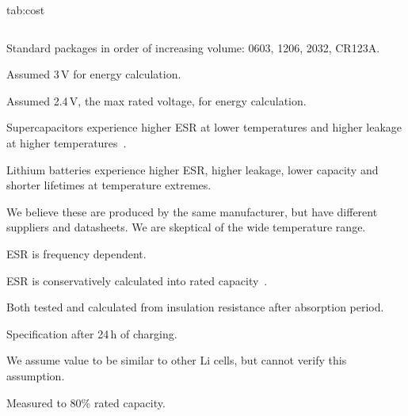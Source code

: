 \begin{definetable*}{tab:cost}
\begin{adjustbox}{width=0.95\textwidth}
\begin{threeparttable}
\begin{tabular}{l | l | S[table-format=3.2,table-align-text-post = false] | S[table-format=3.3,table-align-text-post = false] | c | c | c | c | c | c | c}
   \end{tabular}
    \begin{tablenotes}[para]
        \item[a] Standard packages in order of increasing volume: 0603, 1206, 2032, CR123A.
        \item[b] Assumed 3\,V for energy calculation.
        \item[c] Assumed 2.4\,V, the max rated voltage, for energy calculation.
        \item[d] Supercapacitors experience higher ESR at lower temperatures and higher leakage at higher temperatures~\cite{murataTech}.\\
        \item[e] Lithium batteries experience higher ESR, higher leakage, lower capacity and shorter lifetimes at temperature extremes.\\
        \item[f] We believe these are produced by the same manufacturer, but have different suppliers and datasheets. We are skeptical of the wide temperature range.\\
        \item[g] ESR is frequency dependent.
        \item[h] ESR is conservatively calculated into rated capacity~\cite{feeneyDynamics14}.
        \item[i] Both tested and calculated from insulation resistance after absorption period.\\
        \item[j] Specification after 24\,h of charging.
        \item[k] We assume value to be similar to other Li cells, but cannot verify this assumption.\\
        \item[l] Measured to 80\% rated capacity.

\end{tablenotes}
\end{threeparttable}
\end{adjustbox}
\end{definetable*}
